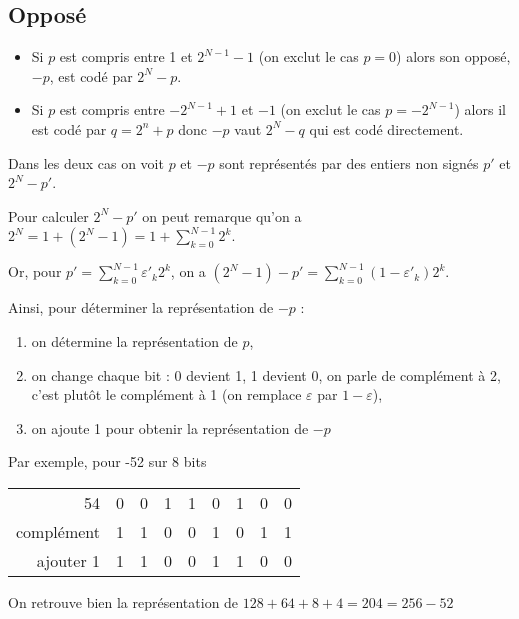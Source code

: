 \subsection{Opposé}
\begin{itemize}
\item Si $p$ est compris entre 1 et $2^{N-1}-1$ (on exclut le cas $p=0$) alors son opposé, $-p$, est codé par $2^N -p$.
\item Si $p$ est compris entre $-2^{N-1}+1$ et $-1$ (on exclut le cas $p=-2^{N-1}$) alors il est codé par $q=2^n+p$ donc $-p$ vaut $2^N-q$ qui est codé directement.
\end{itemize}
Dans les deux cas on voit $p$ et $-p$ sont représentés par des entiers non signés $p'$ et $2^N-p'$.

\medskip
Pour calculer $2^N-p'$ on peut remarque qu'on a $\displaystyle 2^N = 1 + (2^N-1) = 1 + \sum_{k=0}^{N-1} 2^k$.

Or, pour $\displaystyle p' = \sum_{k=0}^{N-1} \varepsilon'_k 2^k$, on a 
$\displaystyle (2^N - 1) - p' = \sum_{k=0}^{N-1} (1 -\varepsilon'_k) 2^k$.

\newpage

Ainsi, pour déterminer la représentation de $-p$ :
\begin{enumerate}
\item on détermine la représentation de $p$,
\item on change chaque bit : 0 devient 1, 1 devient 0, on parle de complément à 2, c'est plutôt le complément à 1 (on remplace $\varepsilon$ par $1-\varepsilon$),
\item on ajoute 1 pour obtenir la représentation de $-p$
\end{enumerate}

Par exemple, pour -52 sur 8 bits
\begin{center}
\begin{tabular}{r|cccccccc}
54         &0&0&1&1&0&1&0&0\\
complément &1&1&0&0&1&0&1&1\\
ajouter 1  &1&1&0&0&1&1&0&0\\
\end{tabular}
\end{center}
On retrouve bien la représentation de $128+64+8+4=204=256-52$
